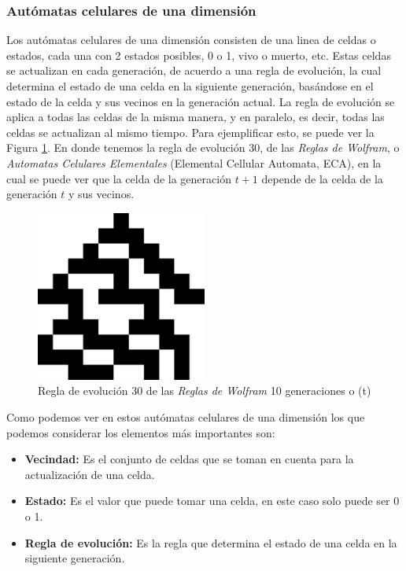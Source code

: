 \subsubsection{Aut\'omatas celulares de una dimensi\'on}
\label{sec:AutomatasCel1D}
    Los aut\'omatas celulares de una dimensi\'on consisten de una linea de celdas o estados, cada una con 2 estados posibles, 
        0 o 1, vivo o muerto, etc. Estas celdas se actualizan en cada generaci\'on, de acuerdo a una regla de evoluci\'on, 
        la cual determina el estado de una celda en la siguiente generaci\'on, bas\'andose en el estado de la celda y sus 
        vecinos en la generaci\'on actual. La regla de evoluci\'on se aplica a todas las celdas de la misma manera, y en 
        paralelo, es decir, todas las celdas se actualizan al mismo tiempo. Para ejemplificar esto, se puede ver la Figura
        \ref{fig:automataCelular1D}. En donde tenemos la regla de evoluci\'on 30, de las \textit{Reglas de Wolfram}\cite{Wolfram1959}, o
        \textit{Automatas Celulares Elementales} (Elemental Cellular Automata, ECA), en la cual se puede ver que la celda de la generaci\'on $t+1$ depende
        de la celda de la generaci\'on $t$ y sus vecinos.
        \begin{figure}[h!]
            \centering
            \includegraphics[width=0.5\textwidth]{./images/marco_teorico/automatas_celulares/Regla30.png}
            \caption{Regla de evoluci\'on 30 de las \textit{Reglas de Wolfram} 10 generaciones o (t)}
            \label{fig:automataCelular1D}
        \end{figure}
    \vskip 0.5cm
    Como podemos ver en estos aut\'omatas celulares de una dimensi\'on los que podemos considerar los elementos m\'as importantes son:
        \begin{itemize}
            \item \textbf{Vecindad:} Es el conjunto de celdas que se toman en cuenta para la actualizaci\'on de una celda.
            \item \textbf{Estado:} Es el valor que puede tomar una celda, en este caso solo puede ser 0 o 1.
            \item \textbf{Regla de evoluci\'on:} Es la regla que determina el estado de una celda en la siguiente generaci\'on.
        \end{itemize}
